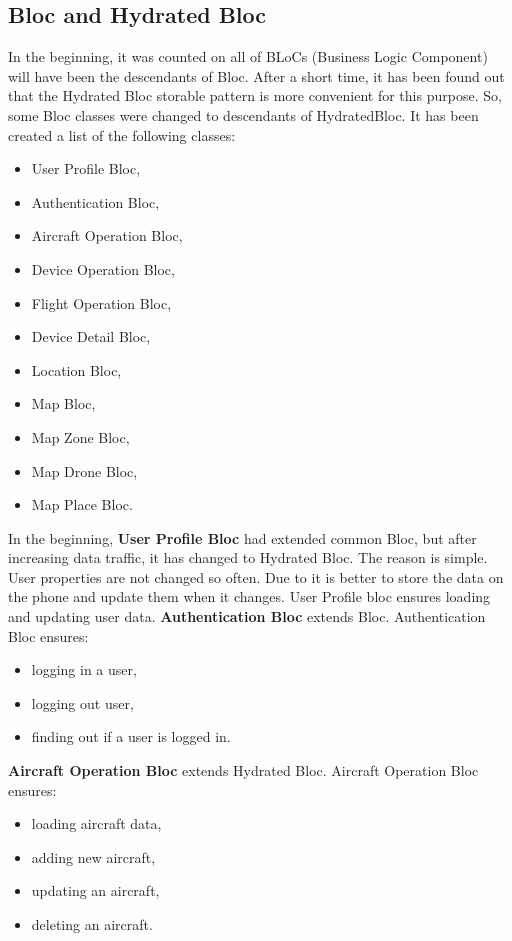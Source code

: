 \subsection{Bloc and Hydrated Bloc}\label{subsec:bloc-and-hydrated-bloc}
In the beginning, it was counted on all of BLoCs (Business Logic Component) will have been the descendants of Bloc.
After a short time, it has been found out that the Hydrated Bloc storable pattern is more convenient for this purpose.
So, some Bloc classes were changed to descendants of HydratedBloc.
It has been created a list of the following classes:
\begin{itemize}
    \item User Profile Bloc,
    \item Authentication Bloc,
    \item Aircraft Operation Bloc,
    \item Device Operation Bloc,
    \item Flight Operation Bloc,
    \item Device Detail Bloc,
    \item Location Bloc,
    \item Map Bloc,
    \item Map Zone Bloc,
    \item Map Drone Bloc,
    \item Map Place Bloc.
\end{itemize}
In the beginning, \textbf{User Profile Bloc} had extended common Bloc, but after increasing data traffic, it has changed to Hydrated Bloc.
The reason is simple.
User properties are not changed so often.
Due to it is better to store the data on the phone and update them when it changes.
User Profile bloc ensures loading and updating user data.
\newline
\newline
\textbf{Authentication Bloc} extends Bloc.
Authentication Bloc ensures:
\begin{itemize}
    \item logging in a user,
    \item logging out user,
    \item finding out if a user is logged in.
\end{itemize}
\textbf{Aircraft Operation Bloc} extends Hydrated Bloc.
Aircraft Operation Bloc ensures:
\begin{itemize}
    \item loading aircraft data,
    \item adding new aircraft,
    \item updating an aircraft,
    \item deleting an aircraft.
\end{itemize}
